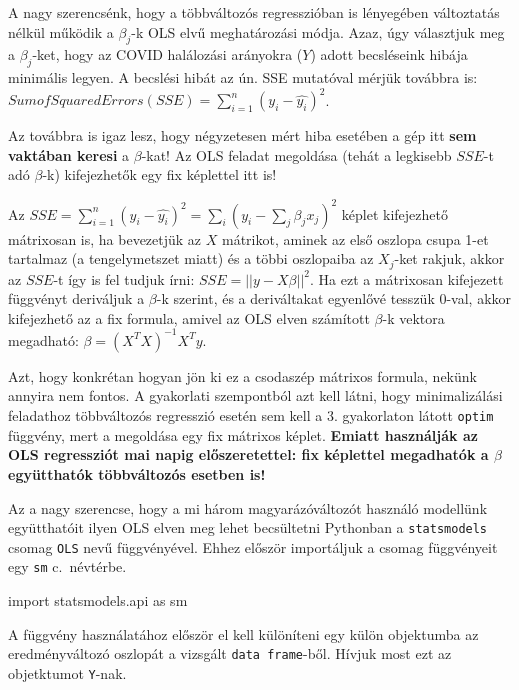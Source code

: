 \documentclass[
]{book}
\newenvironment{Shaded}{\begin{snugshade}}{\end{snugshade}}
\newcommand{\ImportTok}[1]{#1}
\newcommand{\NormalTok}[1]{#1}
\begin{document}
A nagy szerencsénk, hogy a többváltozós regresszióban is lényegében változtatás nélkül működik a \(\beta_j\)-k OLS elvű meghatározási módja.
Azaz, úgy választjuk meg a \(\beta_j\)-ket, hogy az COVID halálozási arányokra (\(Y\)) adott becsléseink hibája minimális legyen. A becslési hibát az ún. SSE mutatóval mérjük továbbra is: \(Sum of Squared Errors (SSE) = \sum_{i=1}^n(y_i-\hat{y_i})^2\).

Az továbbra is igaz lesz, hogy négyzetesen mért hiba esetében a gép itt \textbf{sem vaktában keresi} a \(\beta\)-kat! Az OLS feladat megoldása (tehát a legkisebb \(SSE\)-t adó \(\beta\)-k) kifejezhetők egy fix képlettel itt is!

Az \(SSE=\sum_{i=1}^n(y_i-\hat{y_i})^2=\sum_{i}(y_i-\sum_{j}\beta_jx_j)^2\) képlet kifejezhető mátrixosan is, ha bevezetjük az \(X\) mátrikot, aminek az első oszlopa csupa 1-et tartalmaz (a tengelymetszet miatt) és a többi oszlopaiba az \(X_j\)-ket rakjuk, akkor az \(SSE\)-t így is fel tudjuk írni: \(SSE=||y-X\beta||^2\). Ha ezt a mátrixosan kifejezett függvényt deriváljuk a \(\beta\)-k szerint, és a deriváltakat egyenlővé tesszük 0-val, akkor kifejezhető az a fix formula, amivel az OLS elven számított \(\beta\)-k vektora megadható: \(\beta=(X^TX)^{-1}X^Ty\).

Azt, hogy konkrétan hogyan jön ki ez a csodaszép mátrixos formula, nekünk annyira nem fontos. A gyakorlati szempontból azt kell látni, hogy minimalizálási feladathoz többváltozós regresszió esetén sem kell a 3. gyakorlaton látott \texttt{optim} függvény, mert a megoldása egy fix mátrixos képlet. \textbf{Emiatt használják az OLS regressziót mai napig előszeretettel: fix képlettel megadhatók a \(\beta\) együtthatók többváltozós esetben is!}

Az a nagy szerencse, hogy a mi három magyarázóváltozót használó modellünk együtthatóit ilyen OLS elven meg lehet becsültetni Pythonban a \texttt{statsmodels} csomag \texttt{OLS} nevű függvényével. Ehhez először importáljuk a csomag függvényeit egy \texttt{sm} c.~névtérbe.

\begin{Shaded}
\begin{Highlighting}[]
\ImportTok{import}\NormalTok{ statsmodels.api }\ImportTok{as}\NormalTok{ sm}
\end{Highlighting}
\end{Shaded}

A függvény használatához először el kell különíteni egy külön objektumba az eredményváltozó oszlopát a vizsgált \texttt{data\ frame}-ből. Hívjuk most ezt az objetktumot \texttt{Y}-nak.
\end{document}
